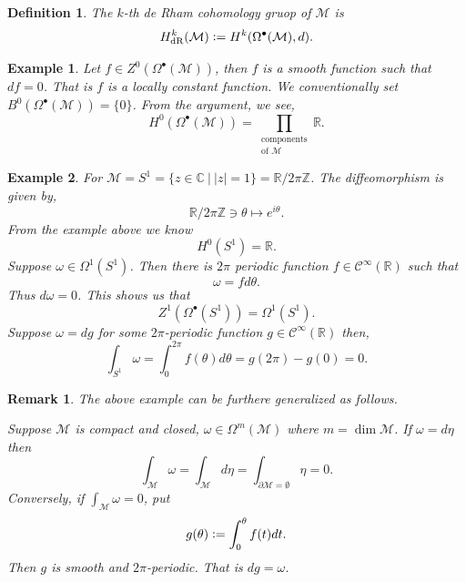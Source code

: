 \documentclass[10pt]{article}
\newtheorem{definition}{Definition}[section]
\newtheorem{remark}{Remark}[section]
\newtheorem{example}{Example}[section]
\DeclareMathOperator{\dR}{dR}
\newcommand{\defeq}{\vcentcolon=}
\newcommand{\R}[0]{\mathbb{R}}
\newcommand{\Z}[0]{\mathbb{Z}}
\newcommand{\C}[0]{\mathbb{C}}
\newcommand{\M}[0]{\mathcal{M}}
\newcommand{\cinf}[0]{\mathcal{C}^\infty}
\newcommand{\sep}[0]{\:|\:}
\begin{document}
\begin{definition}
  The $k$-th de Rham cohomology gruop of $\M$ is 
  \begin{equation*}
    H^k_{\dR}(\M) \defeq H^k(\Omega^\bullet(\M),d).
  \end{equation*}
\end{definition}

\begin{example}
  Let $f\in Z^0(\Omega^\bullet(\M))$, then $f$ is a smooth function such that $df=0$. That is $f$ is a locally constant function. We conventionally set $B^0(\Omega^\bullet(\M)) = \{0\}$. From the argument, we see,
  \begin{equation*}
    H^0(\Omega^\bullet(\M)) = \prod_{\substack{\text{components}\\\text{of $\M$}}}\R.
  \end{equation*}
\end{example}

\begin{example}
  For $\M = S^1 = \{z\in\C\sep \vert z\vert = 1\}=\R/2\pi\Z$. The diffeomorphism is given by,
  \begin{equation*}
    \R/2\pi\Z\ni \theta\mapsto e^{i\theta}.
  \end{equation*}
  From the example above we know 
  \begin{equation*}
    H^0(S^1) = \R.
  \end{equation*}
  \label{example_zeroth_cohomology_circle}
  Suppose $\omega\in\Omega^1(S^1)$. Then there is $2\pi$ periodic function $f\in\cinf(\R)$ such that 
  \begin{equation*}
    \omega = fd\theta.
  \end{equation*}
  Thus $d\omega = 0$. This shows us that 
  \begin{equation*}
    Z^1(\Omega^\bullet(S^1)) = \Omega^1(S^1).
  \end{equation*}
  Suppose $\omega = dg$ for some $2\pi$-periodic function $g\in\cinf(\R)$ then,
  \begin{equation*}
    \int_{S^1}\omega = \int_0^{2\pi}f(\theta)d\theta = g(2\pi)-g(0)=0.
  \end{equation*}
\end{example}

\begin{remark}
  The above example can be furthere generalized as follows. 
  \par Suppose $\M$ is compact and closed, $\omega\in\Omega^m(\M)$ where $m=\dim \M$. If $\omega = d\eta$ then 
  \begin{equation*}
    \int_\M\omega = \int_\M d\eta = \int_{\partial \M = \emptyset}\eta=0.
  \end{equation*}
  Conversely, if $\int_\M\omega = 0$, put 
  \begin{equation*}
    g(\theta) \defeq \int_0^\theta f(t)dt.
  \end{equation*}
  Then $g$ is smooth and $2\pi$-periodic. That is $dg = \omega$.
\end{remark}
\end{document}
